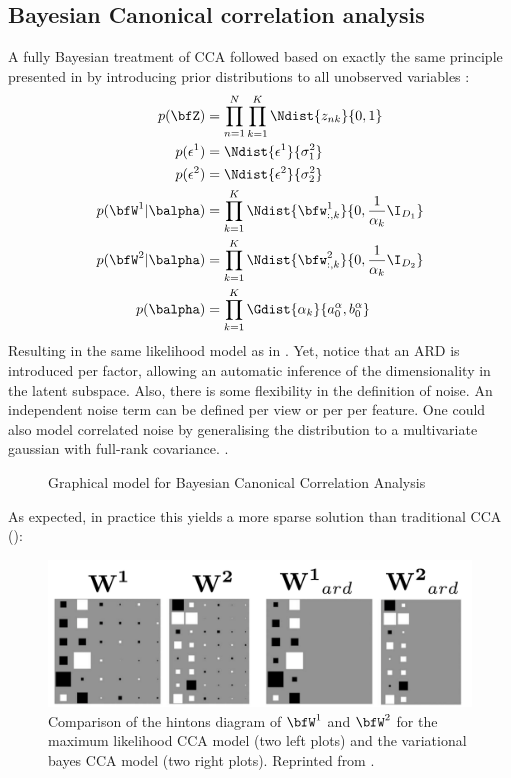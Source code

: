 \subsection{Bayesian Canonical correlation analysis} \label{section:bayesian_cca}
A fully Bayesian treatment of CCA followed based on exactly the same principle presented in  by introducing prior distributions to all unobserved variables \cite{Wang2007,Klami2013}:
\begin{align*} 
	p(\bfZ) &= \prod_{n=1}^{N} \prod_{k=1}^{K} \Ndist{z_{nk}}{0,1} \\
	p(\epsilon^{1}) &= \Ndist {\epsilon^{1}}{\sigma_{1}^{2}} \\
	p(\epsilon^{2}) &= \Ndist {\epsilon^{2}}{\sigma_{2}^{2}} \\
	p(\bfW^1|\balpha) &= \prod_{k=1}^{K} \Ndist{\bfw^{1}_{:,k}}{0,\frac{1}{\alpha_{k}}\I_{D_1}} \\
	p(\bfW^2|\balpha) &= \prod_{k=1}^{K} \Ndist{\bfw^{2}_{:,k}}{0,\frac{1}{\alpha_{k}}\I_{D_2}} \\
	p(\balpha) &= \prod_{k=1}^{K} \Gdist{\alpha_k}{a_0^\alpha, b_0^\alpha}
\end{align*}
Resulting in the same likelihood model as in . Yet, notice that an ARD is introduced per factor, allowing an automatic inference of the dimensionality in the latent subspace.
Also, there is some flexibility in the definition of noise. An independent noise term can be defined per view or per per feature. One could also model correlated noise by generalising the distribution to a multivariate gaussian with full-rank covariance. \cite{Wang2007,Klami2013}.\\

\begin{figure}[H] \begin{center}
	
	\label{fig:graphical_bayesianCCA}
	\caption{Graphical model for Bayesian Canonical Correlation Analysis}
\end{center} \end{figure}

As expected, in practice this yields a more sparse solution than traditional CCA ():

\begin{figure}[H]
	\centering
	\includegraphics[width=0.85\linewidth]{hinton_cca}
	\caption{Comparison of the hintons diagram of $\bfW^{1}$ and $\bfW^{2}$ for the maximum likelihood CCA model (two left plots) and the variational bayes CCA model (two right plots). Reprinted from \cite{Wang2007}.}
	\label{fig:hinton_cca}
\end{figure}


